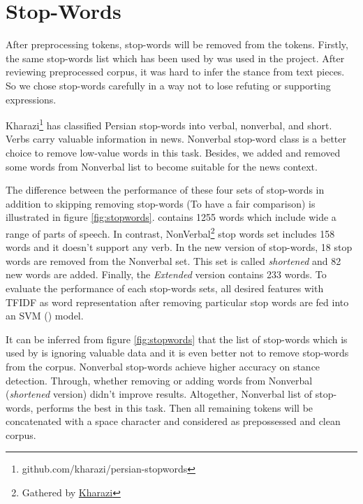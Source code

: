 \section{Stop-Words}
After preprocessing tokens, stop-words will be removed from the tokens. Firstly, the same stop-words list which has been used by \cite{stance_persian} was used in the project. After reviewing preprocessed corpus, it was hard to infer the stance from text pieces. So we chose stop-words carefully in a way not to lose refuting or supporting expressions.

Kharazi\footnote{\label{fn:kharazi}github.com/kharazi/persian-stopwords} has classified Persian stop-words into verbal, nonverbal, and short. Verbs carry valuable information in news. Nonverbal stop-word class is a better choice to remove low-value words in this task. Besides, we added and removed some words from Nonverbal list to become suitable for the news context. 


The difference between the performance of these four sets of stop-words in addition to skipping removing stop-words (To have a fair comparison) is illustrated in figure \ref{fig:stopwords}. \cite{stance_persian} contains 1255 words which include wide a range of parts of speech. In contrast, NonVerbal\footnote{Gathered by \href{github.com/kharazi/persian-stopwords}{Kharazi}} stop words set includes 158 words and it doesn't support any verb. In the new version of stop-words, 18 stop words are removed from the Nonverbal set. This set is called \textit{shortened} and 82 new words are added. Finally, the \textit{Extended} version contains 233 words. To evaluate the performance of each stop-words sets, all desired features with \ac{TFIDF} as word representation after removing particular stop words are fed into an \ac{SVM} (\cite{svc}) model.

It can be inferred from figure \ref{fig:stopwords} that the list of stop-words which is used by \cite{stance_persian} is ignoring valuable data and it is even better not to remove stop-words from the corpus. Nonverbal stop-words achieve higher accuracy on stance detection. Through, whether removing or adding words from Nonverbal (\textit{shortened} version) didn't improve results. Altogether, Nonverbal list of stop-words, performs the best in this task. 
Then all remaining tokens will be concatenated with a space character and considered as prepossessed and clean corpus.

